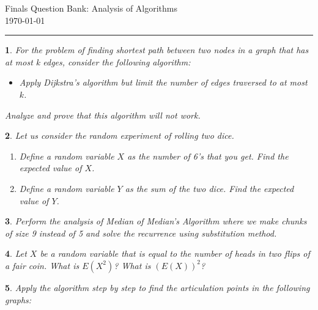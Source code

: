 \documentclass[%
addpoints]{exam}
\theoremstyle{problem}
\newtheorem{p}{}
\begin{document}
 \pagestyle{empty}
 \begin{FlushLeft}
Finals Question Bank: Analysis of Algorithms\\
\today
\end{FlushLeft}

	
\thispagestyle{myheadings}
\rule{500pt}{1.5pt}

\begin{p}

    For the problem of finding shortest path between two nodes in a graph that has at most k edges,
    consider the following algorithm:
    \begin{itemize}
        \item Apply Dijkstra's algorithm but limit the number of edges traversed to at most \( k \).
    \end{itemize}
    
    Analyze and prove that this algorithm will not work.
    
\hfill \end{p}

\begin{p}
Let us consider the random experiment of rolling two dice.
\begin{enumerate}
    \item Define a random variable \(X\) as the number of 6's that you get. Find the expected value of \(X\).
    \item Define a random variable \(Y\) as the sum of the two dice. Find the expected value of \(Y\).
\end{enumerate}
\hfill \end{p}

\begin{p}
Perform the analysis of Median of Median's Algorithm where we make chunks of size 9 instead of 5 and solve the recurrence using substitution method.
\hfill \end{p}

\begin{p}
Let \( X \) be a random variable that is equal to the number of heads in two flips of a  
fair coin. What is \( E(X^2) \)? What is \( (E(X))^2 \)?
\hfill \end{p}

\begin{p}
Apply the algorithm step by step to find the articulation points in the following graphs:
\end{p}
\end{document}

